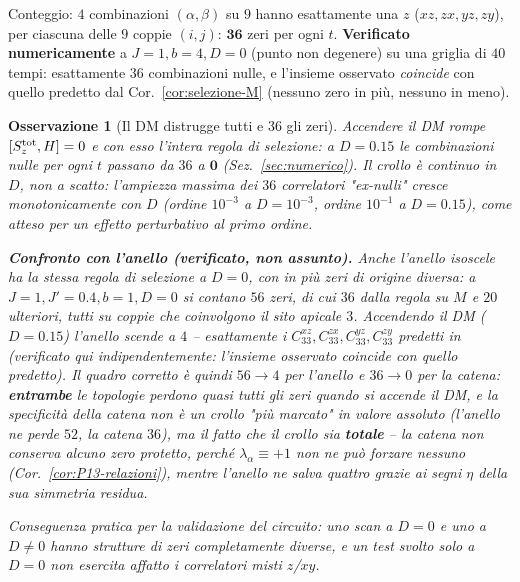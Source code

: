 \documentclass[11pt,a4paper]{article}
\newtheorem{osservazione}{Osservazione}
\begin{document}
Conteggio: $4$ combinazioni $(\alpha,\beta)$ su $9$ hanno esattamente una $z$
($xz,zx,yz,zy$), per ciascuna delle $9$ coppie $(i,j)$: $\mathbf{36}$ zeri per ogni $t$.
\textbf{Verificato numericamente} a $J{=}1,b{=}4,D{=}0$ (punto non degenere) su una griglia di
$40$ tempi: esattamente $36$ combinazioni nulle, e l'insieme osservato \emph{coincide} con quello
predetto dal Cor.~\ref{cor:selezione-M} (nessuno zero in più, nessuno in meno).

\begin{osservazione}[Il DM distrugge tutti e 36 gli zeri]
Accendere il DM rompe $[S_z^{\rm tot},H]=0$ e con esso l'intera regola di selezione: a $D=0.15$
le combinazioni nulle per ogni $t$ passano da $36$ a $\mathbf 0$ (Sez.~\ref{sec:numerico}).
Il crollo è \emph{continuo} in $D$, non a scatto: l'ampiezza massima dei $36$ correlatori
"ex-nulli" cresce monotonicamente con $D$ (ordine $10^{-3}$ a $D=10^{-3}$, ordine $10^{-1}$ a
$D=0.15$), come atteso per un effetto perturbativo al primo ordine.

\textbf{Confronto con l'anello (verificato, non assunto).} Anche l'anello isoscele ha la stessa
regola di selezione a $D=0$, con in più zeri di origine diversa: a $J{=}1,J'{=}0.4,b{=}1,D{=}0$
si contano $56$ zeri, di cui $36$ dalla regola su $M$ e $20$ ulteriori, tutti su coppie che
coinvolgono il sito apicale $3$. Accendendo il DM ($D=0.15$) l'anello scende a $4$ -- esattamente
i $C_{33}^{xz},C_{33}^{zx},C_{33}^{yz},C_{33}^{zy}$ predetti in
\texttt{} (verificato qui
indipendentemente: l'insieme osservato coincide con quello predetto). Il quadro corretto è quindi
$56\to4$ per l'anello e $36\to0$ per la catena: \textbf{entrambe} le topologie perdono quasi tutti
gli zeri quando si accende il DM, e la specificità della catena non è un crollo "più marcato" in
valore assoluto (l'anello ne perde $52$, la catena $36$), ma il fatto che il crollo sia
\textbf{totale} -- la catena non conserva alcuno zero protetto, perché $\lambda_\alpha\equiv+1$
non ne può forzare nessuno (Cor.~\ref{cor:P13-relazioni}), mentre l'anello ne salva quattro grazie
ai segni $\eta$ della sua simmetria residua.

Conseguenza pratica per la validazione del circuito: uno scan a $D=0$ e uno a $D\neq0$ hanno
strutture di zeri completamente diverse, e un test svolto solo a $D=0$ non esercita affatto i
correlatori misti $z$/$xy$.
\end{osservazione}

\end{document}
